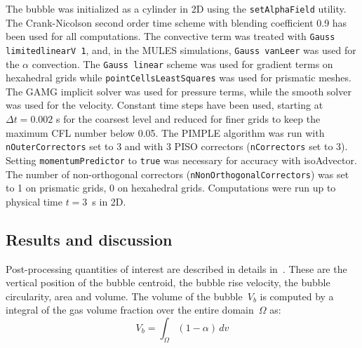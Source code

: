 \documentclass[review]{elsarticle}
\begin{document}
The bubble was initialized as a cylinder in 2D using the \verb+setAlphaField+ utility. The Crank-Nicolson second order time scheme with blending coefficient 0.9 has been used for all computations. The convective term was treated with \verb+Gauss limitedlinearV 1+, and, in the MULES simulations, \verb+Gauss vanLeer+ was used for the $\alpha$ convection. The \verb+Gauss linear+ scheme was used for gradient terms on hexahedral grids while \verb+pointCellsLeastSquares+ was used for prismatic meshes. The GAMG implicit solver was used for pressure terms, while the smooth solver was used for the velocity. Constant time steps have been used, starting at $\Delta t=0.002$ s for the coarsest level and reduced for finer grids to keep the maximum CFL number below 0.05. The PIMPLE algorithm was run with \verb+nOuterCorrectors+ set to 3 and with 3 PISO correctors (\verb+nCorrectors+ set to 3). Setting \verb+momentumPredictor+ to \verb+true+ was necessary for accuracy with isoAdvector. The number of non-orthogonal correctors (\verb+nNonOrthogonalCorrectors+) was set to 1 on prismatic grids, 0 on hexahedral grids. Computations were run up to physical time $t=3$~s in 2D. 

\subsection{Results and discussion}\label{sec_hysingresults}
Post-processing quantities of interest are described in details in~\cite{Hysing2009,Adelsberger2014}. These are the vertical position of the bubble centroid, the bubble rise velocity, the bubble circularity, area and volume. The volume of the bubble~$V_b$ is computed by a integral of the gas volume fraction over the entire domain~$\Omega$ as: 
\begin{equation}
  V_b = \int_{\Omega} (1-\alpha)\,dv
\end{equation}
\end{document}
